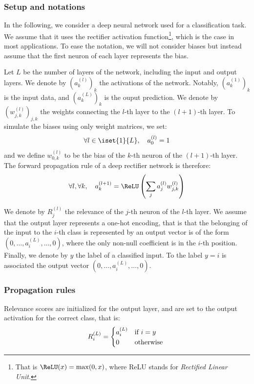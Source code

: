 \documentclass[twocolumn]{../cs-classes/cs-classes}
\newcommand*{\1}{\digitsbb{1}}
\newcommand*{\0}{\digitsbb{0}}
\begin{document}
\subsubsection{Setup and notations}
In the following, we consider a deep neural network used for a classification task. We assume that it uses the rectifier activation function\footnote{That is $\ReLU(x)=\max(0, x)$, where ReLU stands for \emph{Rectified Linear Unit}.}, which is the case in most applications. To ease the notation, we will not consider biases but instead assume that the first neuron of each layer represents the bias. 

Let $L$ be the number of layers of the network, including the input and output layers. We denote by $\left(a^{(l)}_k\right)_k$ the activations of the network. Notably, $\left(a^{(1)}_k\right)_k$ is the input data, and $\left(a^{(L)}_k\right)_k$ is the ouput prediction. We denote by $\left(w^{(l)}_{j, k}\right)_{j, k}$ the weights connecting the $l$-th layer to the $(l+1)$-th layer. To simulate the biases using only weight matrices, we set:
\begin{equation*}
    \forall l\in\iset{1}{L}, \quad a^{(l)}_0 = 1
\end{equation*}
and we define $w^{(l)}_{0, k}$ to be the bias of the $k$-th neuron of the $(l+1)$-th layer. The forward propagation rule of a deep rectifier network is therefore:
\begin{equation}
    \forall l, \forall k, \quad a^{(l+1)}_k = \ReLU\left(\sum_{j}a^{(l)}_j w^{(l)}_{j, k}\right)
\end{equation}

We denote by $R^{(l)}_j$ the relevance of the $j$-th neuron of the $l$-th layer. We assume that the output layer represents a one-hot encoding, that is that the belonging of the input to the $i$-th class is represented by an output vector is of the form $(0, \dots, a^{(L)}_i, \dots, 0)$, where the only non-null coefficient is in the $i$-th position. Finally, we denote by $y$ the label of a classified input. To the label $y=i$ is associated the output vector $(0, \dots, a^{(L)}_i, \dots, 0)$.

\subsubsection{Propagation rules}
Relevance scores are initialized for the output layer, and are set to the output activation for the correct class, that is:
\begin{equation}
    R^{(L)}_i = \begin{cases*}
        a^{(L)}_i & if $i = y$\\
        0 & otherwise
    \end{cases*}
\end{equation}
\end{document}
